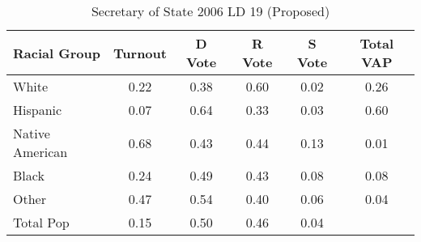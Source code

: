 \begin{table}[htb]
\begin{center}
\caption{Secretary of State 2006 LD 19 (Proposed)}
\label{sos06_vap_ld_19}
\begin{tabular}{lccccc}
  \hline
Racial Group & Turnout & D Vote & R Vote & S Vote & Total VAP \\ 
  \hline
White & 0.22 & 0.38 & 0.60 & 0.02 & 0.26 \\ 
  Hispanic & 0.07 & 0.64 & 0.33 & 0.03 & 0.60 \\ 
  Native American & 0.68 & 0.43 & 0.44 & 0.13 & 0.01 \\ 
  Black & 0.24 & 0.49 & 0.43 & 0.08 & 0.08 \\ 
  Other & 0.47 & 0.54 & 0.40 & 0.06 & 0.04 \\ 
  Total Pop & 0.15 & 0.50 & 0.46 & 0.04 &  \\ 
   \hline
\end{tabular}
\end{center}
\end{table}
